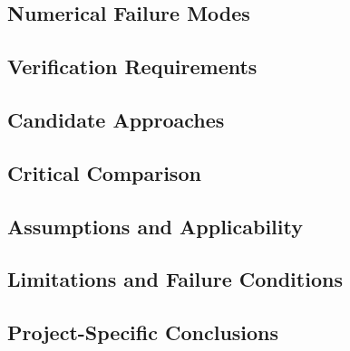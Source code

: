 \subsection{Numerical Failure Modes}
\label{sec:res-num-msh-numerical-failure-modes}


\subsection{Verification Requirements}
\label{sec:res-num-msh-verification-requirements}


\subsection{Candidate Approaches}
\label{sec:res-num-msh-candidate-approaches}


\subsection{Critical Comparison}
\label{sec:res-num-msh-critical-comparison}


\subsection{Assumptions and Applicability}
\label{sec:res-num-msh-assumptions}


\subsection{Limitations and Failure Conditions}
\label{sec:res-num-msh-limitations}


\subsection{Project-Specific Conclusions}
\label{sec:res-num-msh-conclusions}

